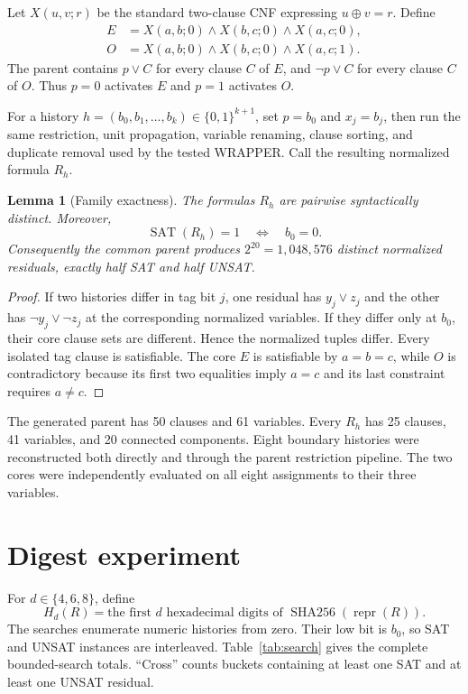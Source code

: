 \documentclass[11pt]{article}
\newtheorem{lemma}{Lemma}
\newcommand{\SAT}{\operatorname{SAT}}
\newcommand{\bits}{\{0,1\}}
\begin{document}
Let $X(u,v;r)$ be the standard two-clause CNF expressing
$u\mathbin{\oplus}v=r$.  Define
\begin{align*}
 E&=X(a,b;0)\land X(b,c;0)\land X(a,c;0),\\
 O&=X(a,b;0)\land X(b,c;0)\land X(a,c;1).
\end{align*}
The parent contains $p\lor C$ for every clause $C$ of $E$, and
$\neg p\lor C$ for every clause $C$ of $O$.  Thus $p=0$ activates $E$ and
$p=1$ activates $O$.

For a history $h=(b_0,b_1,\ldots,b_k)\in\bits^{k+1}$, set $p=b_0$ and
$x_j=b_j$, then run the same restriction, unit propagation, variable
renaming, clause sorting, and duplicate removal used by the tested WRAPPER.
Call the resulting normalized formula $R_h$.

\begin{lemma}[Family exactness]
The formulas $R_h$ are pairwise syntactically distinct.  Moreover,
\[
 \SAT(R_h)=1\quad\Longleftrightarrow\quad b_0=0.
 \tag{2}
\]
Consequently the common parent produces $2^{20}=1{,}048{,}576$ distinct
normalized residuals, exactly half SAT and half UNSAT.
\end{lemma}

\begin{proof}
If two histories differ in tag bit $j$, one residual has
$y_j\lor z_j$ and the other has $\neg y_j\lor\neg z_j$ at the corresponding
normalized variables.  If they differ only at $b_0$, their core clause sets
are different.  Hence the normalized tuples differ.  Every isolated tag
clause is satisfiable.  The core $E$ is satisfiable by $a=b=c$, while $O$ is
contradictory because its first two equalities imply $a=c$ and its last
constraint requires $a\ne c$.
\end{proof}

The generated parent has 50 clauses and 61 variables.  Every $R_h$ has 25
clauses, 41 variables, and 20 connected components.  Eight boundary histories
were reconstructed both directly and through the parent restriction pipeline.
The two cores were independently evaluated on all eight assignments to their
three variables.

\section{Digest experiment}

For $d\in\{4,6,8\}$, define
\[
 H_d(R)=\text{the first $d$ hexadecimal digits of }
          \operatorname{SHA256}(\operatorname{repr}(R)).
 \tag{3}
\]
The searches enumerate numeric histories from zero.  Their low bit is
$b_0$, so SAT and UNSAT instances are interleaved.  Table~\ref{tab:search}
gives the complete bounded-search totals.  ``Cross'' counts buckets
containing at least one SAT and at least one UNSAT residual.
\end{document}
